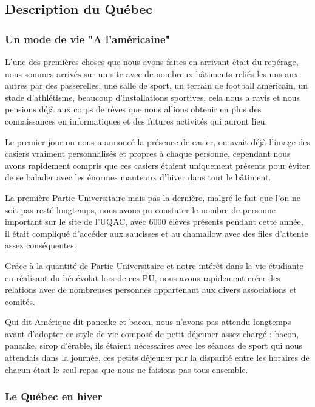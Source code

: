 \lipsum[8-2] %

\subsection{Description du Québec}

\subsubsection{Un mode de vie "A l'américaine"}

L’une des premières choses que nous avons faites en arrivant était du repérage, nous sommes arrivés sur un site avec de nombreux bâtiments reliés les uns aux autres par des passerelles, une salle de sport, un terrain de football américain, un stade d’athlétisme, beaucoup d’installations sportives, cela nous a ravis et nous pensions déjà aux corps de rêves que nous allions obtenir en plus des connaissances en informatiques et des futures activités qui auront lieu. 

Le premier jour on nous a annoncé la présence de casier, on avait déjà l’image des casiers vraiment personnalisés et propres à chaque personne, cependant nous avons rapidement compris que ces casiers étaient uniquement présents pour éviter de se balader avec les énormes manteaux d’hiver dans tout le bâtiment. 

La première Partie Universitaire mais pas la dernière, malgré le fait que l'on ne soit pas resté longtemps, nous avons pu constater le nombre de personne important sur le site de l’UQAC, avec 6000 élèves présents pendant cette année, il était compliqué d’accéder aux saucisses et au chamallow avec des files d’attente assez conséquentes. 

Grâce à la quantité de Partie Universitaire et notre intérêt dans la vie étudiante en réalisant du bénévolat lors de ces PU, nous avons rapidement créer des relations avec de nombreuses personnes appartenant aux divers associations et comités. 


Qui dit Amérique dit pancake et bacon, nous n’avons pas attendu longtemps avant d’adopter ce style de vie composé de petit déjeuner assez chargé : bacon, pancake, sirop d’érable, ils étaient nécessaires avec les séances de sport qui nous attendais dans la journée, ces petits déjeuner par la disparité entre les horaires de chacun était le seul repas que nous ne faisions pas tous ensemble.  

\subsubsection{Le Québec en hiver}

